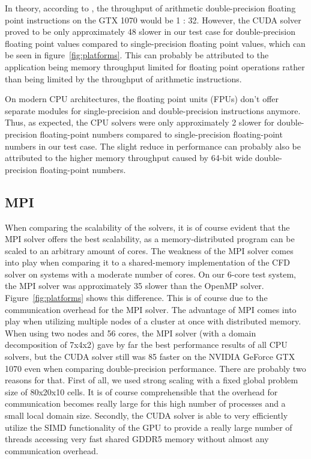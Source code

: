 \documentclass{article}%
\begin{document}
In theory, according to \cite{cuda-guide}, the throughput of arithmetic double-precision floating point instructions on the GTX 1070 would be 1 : 32. However, the CUDA solver proved to be only approximately 48\text{\%} slower in our test case for double-precision floating point values compared to single-precision floating point values, which can be seen in figure~\ref{fig:platforms}. This can probably be attributed to the application being memory throughput limited for floating point operations rather than being limited by the throughput of arithmetic instructions.

On modern CPU architectures, the floating point units (FPUs) don’t offer separate modules for single-precision and double-precision instructions anymore. Thus, as expected, the CPU solvers were only approximately 2\text{\%} slower for double-precision floating-point numbers compared to single-precision floating-point numbers in our test case. The slight reduce in performance can probably also be attributed to the higher memory throughput caused by 64-bit wide double-precision floating-point numbers.

\subsection{MPI}
When comparing the scalability of the solvers, it is of course evident that the MPI solver offers the best scalability, as a memory-distributed program can be scaled to an arbitrary amount of cores. The weakness of the MPI solver comes into play when comparing it to a shared-memory implementation of the CFD solver on systems with a moderate number of cores. On our 6-core test system, the MPI solver was approximately 35\text{\%} slower than the OpenMP solver. Figure~\ref{fig:platforms} shows this difference. This is of course due to the communication overhead for the MPI solver. The advantage of MPI comes into play when utilizing multiple nodes of a cluster at once with distributed memory.
When using two nodes and 56 cores, the MPI solver (with a domain decomposition of 7x4x2) gave by far the best performance results of all CPU solvers, but the CUDA solver still was 85\text{\%} faster on the NVIDIA GeForce GTX 1070 even when comparing double-precision performance. There are probably two reasons for that. First of all, we used strong scaling with a fixed global problem size of 80x20x10 cells. It is of course comprehensible that the overhead for communication becomes really large for this high number of processes and a small local domain size. Secondly, the CUDA solver is able to very efficiently utilize the SIMD functionality of the GPU to provide a really large number of threads accessing very fast shared GDDR5 memory without almost any communication overhead.
\end{document}

